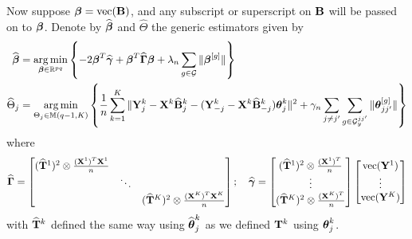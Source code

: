 \documentclass[12pt, letterpaper]{article}
\theoremstyle{definition}
\DeclareMathOperator*{\ve}{vec}
\DeclareMathOperator*{\argmin}{arg\,min}
\numberwithin{equation}{section}
\begin{document}
Now suppose $\bfbeta = \ve (\bfB)$, and any subscript or superscript on ${\mathbf{B}}$ will be passed on to ${\boldsymbol{\beta}}$. Denote by $\widehat {{\boldsymbol{\beta}}}$ and $\widehat \Theta$ the generic estimators given by
%
\begin{align}
\widehat \bfbeta &= \argmin_{\bfbeta \in \BR^{pq}} \left\{-2 \bfbeta^T \widehat \bfgamma + \bfbeta^T \widehat \bfGamma \bfbeta + \lambda_n \sum_{g \in \cG} \| \bfbeta^{[g]}  \| \right\} \label{eqn:EstEqn1}\\
\widehat \Theta_j &= \argmin_{\Theta_j \in \BM(q-1, K)} \left\{ \frac{1}{n} \sum_{k=1}^K \| \bfY^k_j - \bfX^k \widehat \bfB_j^k - (\bfY_{-j}^k - \bfX^k \widehat \bfB^k_{-j} ) \bftheta_j^k \|^2 + \gamma_n \sum_{j \neq j'} \sum_{g \in \cG_y^{jj'}} \| \bftheta_{jj'}^{[g]} \| \right\} \label{eqn:EstEqn2}
\end{align}
%
where
%
$$
\widehat \bfGamma = \begin{bmatrix}
(\widehat \bfT^1)^2 \otimes \frac{(\bfX^1)^T \bfX^1}{n} & &\\
& \ddots &\\
& & (\widehat \bfT^K)^2 \otimes \frac{(\bfX^K)^T \bfX^K}{n}
\end{bmatrix}; \quad
\widehat \bfgamma = \begin{bmatrix}
(\widehat \bfT^1)^2 \otimes \frac{(\bfX^1)^T}{n}\\
\vdots\\
(\widehat \bfT^K)^2 \otimes \frac{(\bfX^K)^T}{n}
\end{bmatrix}
\begin{bmatrix}
\ve (\bfY^1)\\
\vdots\\
\ve (\bfY^K)
\end{bmatrix}
$$
with $\widehat {{\mathbf{T}}}^k$ defined the same way using $\widehat {{\boldsymbol{\theta}}}_j^k$ as we defined ${\mathbf{T}}^k$ using ${\boldsymbol{\theta}}_j^k$.
\end{document}
